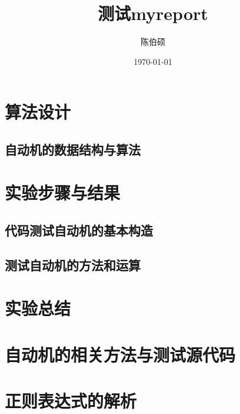 \documentclass[pdfCover]{myreport} %
\title{测试myreport}
\author{陈伯硕}
\date{\today}
\begin{document}
\maketitle
\pagestyle{empty}

\setcounter{section}{3}
\section{算法设计}
  \subsection{自动机的数据结构与算法}
    
\section{实验步骤与结果}
  \subsection{代码测试自动机的基本构造}
    
  \subsection{测试自动机的方法和运算}
    




\section{实验总结}



\nocite{alfred_v_aho_compilers_2006}
\nocite{automata-from-regex}
\nocite{recursive-descent}

\begin{appendices}
  \section{自动机的相关方法与测试源代码}
    
  \section{正则表达式的解析}
    
\end{appendices}
\end{document}
